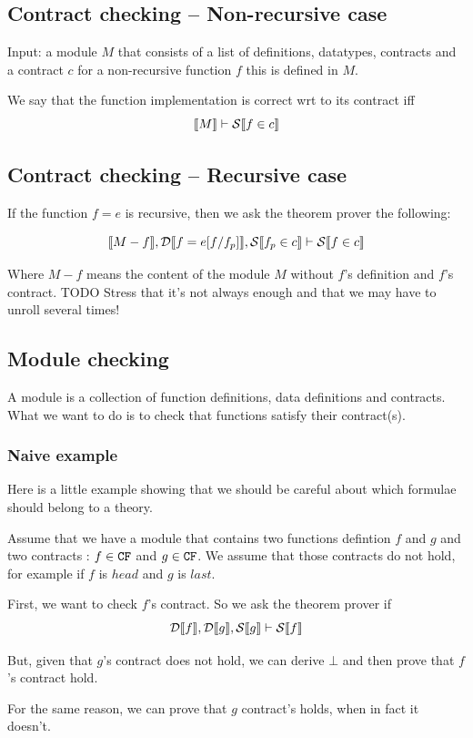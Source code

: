 \documentclass[preprint]{sigplanconf}
\begin{document}
\subsection{Contract checking -- Non-recursive case}
Input: a module $M$ that consists of a list of definitions, datatypes,
contracts and a contract $c$ for a non-recursive function $f$ this is
defined in $M$.

We say that the function implementation is correct wrt to its contract
iff $$\llbracket M \rrbracket \vdash \mathcal{S} \llbracket f \in c \rrbracket$$

\subsection{Contract checking -- Recursive case}
If the function $f=e$ is recursive, then we ask the theorem prover the
following:

$$\llbracket M - f \rrbracket, \mathcal{D} \llbracket f=e[f/f_p] \rrbracket, \mathcal{S} \llbracket f_p \in c \rrbracket \vdash \mathcal{S} \llbracket f \in c \rrbracket$$

Where $M - f $ means the content of the module $M$ without $f$'s
definition and $f$'s contract. TODO Stress that it's not always enough
and that we may have to unroll several times!

\subsection{Module checking}
A module is a collection of function definitions, data definitions and
contracts. What we want to do is to check that functions satisfy their
contract(s). 

\subsubsection{Naive example}
Here is a little example showing that we should be careful about which
formulae should belong to a theory.

Assume that we have a module that contains two functions defintion $f$
and $g$ and two contracts : $f \in \texttt{CF}$ and $g \in \texttt{CF}$. We assume
that those contracts do not hold, for example if $f$ is $head$ and $g$
is $last$.

First, we want to check $f$'s contract. So we ask the theorem prover
if
$$ \mathcal{D} \llbracket f \rrbracket, \mathcal{D} \llbracket g \rrbracket, \mathcal{S} \llbracket g \rrbracket \vdash \mathcal{S} \llbracket f \rrbracket $$

But, given that $g$'s contract does not hold, we can derive $\bot$ and
then prove that $f$'s contract hold.

For the same reason, we can prove that $g$ contract's holds, when in
fact it doesn't.
\end{document}
